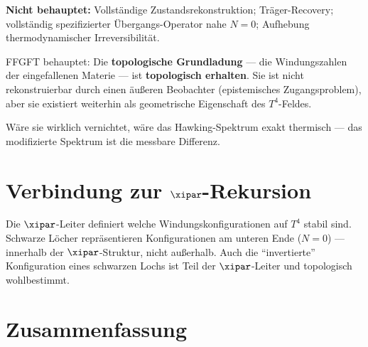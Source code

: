\textbf{Nicht behauptet:} Vollständige Zustandsrekonstruktion; Träger-Recovery; vollständig spezifizierter Übergangs-Operator nahe $N = 0$; Aufhebung thermodynamischer Irreversibilität.

\begin{keyresult}
FFGFT behauptet: Die \textbf{topologische Grundladung} --- die Windungszahlen der eingefallenen Materie --- ist \textbf{topologisch erhalten}. Sie ist nicht rekonstruierbar durch einen äußeren Beobachter (epistemisches Zugangsproblem), aber sie existiert weiterhin als geometrische Eigenschaft des $T^4$-Feldes.

Wäre sie wirklich vernichtet, wäre das Hawking-Spektrum exakt thermisch --- das modifizierte Spektrum ist die messbare Differenz.
\end{keyresult}

\section{Verbindung zur $\xipar$-Rekursion}

Die $\xipar$-Leiter definiert welche Windungskonfigurationen auf $T^4$ stabil sind. Schwarze Löcher repräsentieren Konfigurationen am unteren Ende ($N = 0$) --- innerhalb der $\xipar$-Struktur, nicht außerhalb. Auch die ``invertierte'' Konfiguration eines schwarzen Lochs ist Teil der $\xipar$-Leiter und topologisch wohlbestimmt.

\section*{Zusammenfassung}

